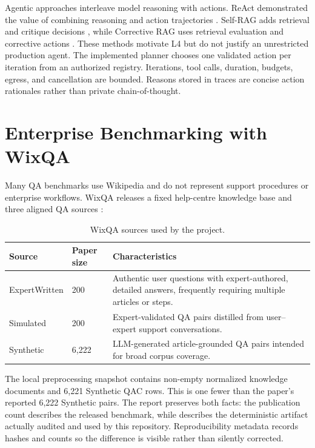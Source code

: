 Agentic approaches interleave model reasoning with actions. ReAct demonstrated
the value of combining reasoning and action trajectories
\cite{yao2023react}. Self-RAG adds retrieval and critique decisions
\cite{asai2024selfrag}, while Corrective RAG uses retrieval evaluation and
corrective actions \cite{yan2024crag}. These methods motivate L4 but do not
justify an unrestricted production agent. The implemented planner chooses one
validated action per iteration from an authorized registry. Iterations, tool
calls, duration, budgets, egress, and cancellation are bounded. Reasons stored
in traces are concise action rationales rather than private chain-of-thought.

\section{Enterprise Benchmarking with WixQA}

Many QA benchmarks use Wikipedia and do not represent support procedures or
enterprise workflows. WixQA releases a fixed help-centre knowledge base and
three aligned QA sources \cite{cohen2025wixqa}:

\begin{table}[H]
  \centering
  \caption{WixQA sources used by the project.}
  \label{tab:wixqa-sources}
  \begin{tabularx}{\textwidth}{p{}p{}X}
    \toprule
    Source & Paper size & Characteristics\\
    \midrule
    ExpertWritten & 200 & Authentic user questions with expert-authored,
    detailed answers, frequently requiring multiple articles or steps.\\
    Simulated & 200 & Expert-validated QA pairs distilled from user--expert
    support conversations.\\
    Synthetic & 6,222 & LLM-generated article-grounded QA pairs intended for
    broad corpus coverage.\\
    \bottomrule
  \end{tabularx}
\end{table}

The local preprocessing snapshot contains \PreparedCorpusDocuments{}
non-empty normalized knowledge documents and 6,221 Synthetic QAC rows. This is
one fewer than the paper's reported 6,222 Synthetic pairs. The report preserves
both facts: the publication count describes the released benchmark, while
\PreparedCorpusDocuments{} describes the deterministic artifact actually
audited and used by this repository. Reproducibility metadata records hashes
and counts so the difference is visible rather than silently corrected.

